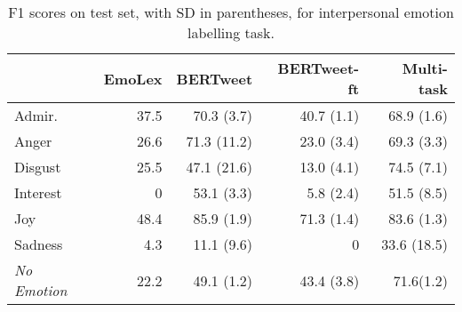 \begin{table}[t]
	\centering
	\begin{tabular}{lrrrr}
		\toprule
		\textbf{} & \textbf{EmoLex} & \textbf{BERTweet} & \textbf{BERTweet-ft} & \textbf{Multi-task} \\\midrule
		Admir. & 37.5 & 70.3 (3.7) & 40.7 (1.1) & 68.9 (1.6) \\
		Anger & 26.6 & 71.3 (11.2) & 23.0 (3.4) & 69.3 (3.3) \\
		Disgust & 25.5 & 47.1 (21.6) & 13.0 (4.1) & 74.5 (7.1) \\
		Interest & 0 & 53.1 (3.3) & 5.8 (2.4) & 51.5 (8.5) \\
		Joy & 48.4 & 85.9 (1.9) & 71.3 (1.4) & 83.6 (1.3) \\
		Sadness & 4.3 & 11.1 (9.6) & 0 & 33.6 (18.5)\\
		\emph{No Emotion} & 22.2 & 49.1 (1.2) & 43.4 (3.8) & 71.6(1.2) \\\bottomrule
	\end{tabular}
	\caption{F1 scores on test set, with SD in parentheses, for interpersonal emotion labelling task.}
	\label{tab:emoresults}
\end{table}
